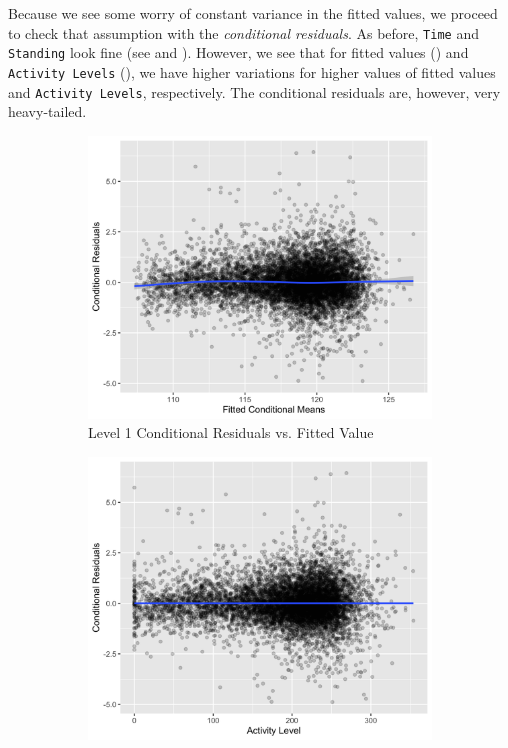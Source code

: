 \documentclass[12pt,twoside,letterpaper]{article}
\theoremstyle{definition}
\theoremstyle{definition}
\begin{document}
Because we see some worry of constant variance in the fitted values, we proceed to check that assumption with the \emph{conditional residuals}. As before, \texttt{Time} and \texttt{Standing} look fine (see  and ). However, we see that for fitted values () and \texttt{Activity Levels} (), we have higher variations for higher values of fitted values and \texttt{Activity Levels}, respectively. The conditional residuals are, however, very heavy-tailed. 
\begin{figure}[H] 
    \centering
    \begin{subfigure}[b]{0.4\textwidth}
    \centering
    \includegraphics[width=\textwidth]{pics/cond resid fit.png}
    \caption[]%
    {{\small Level 1 Conditional Residuals vs. Fitted Value}}
    \label{fig: cond resid v fit}
    \end{subfigure}
    \hfill
    \begin{subfigure}[b]{0.4\textwidth}
    \centering
    \includegraphics[width=\textwidth]{pics/cond resid act.png}

\end{subfigure}
\end{figure}
\end{document}
